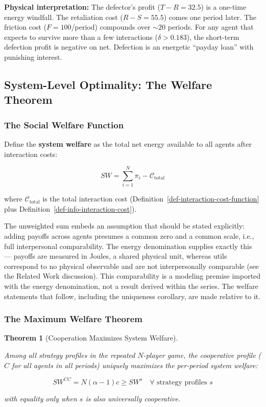 \documentclass[11pt]{article}
\theoremstyle{plain}
\newtheorem{theorem}{Theorem}
\theoremstyle{definition}
\theoremstyle{remark}
\let\origsubsection\subsection
\renewcommand{\subsection}{\needspace{7\baselineskip}\origsubsection}
\let\origsubsubsection\subsubsection
\renewcommand{\subsubsection}{\needspace{4\baselineskip}\origsubsubsection}
\begin{document}
\textbf{Physical interpretation:} The defector's profit
(\(T - R = 32.5\)) is a one-time energy windfall. The retaliation cost
(\(R - S = 55.5\)) comes one period later. The friction cost
(\(F = 100\)/period) compounds over \(\sim 20\) periods. For any agent
that expects to survive more than a few interactions
(\(\delta > 0.183\)), the short-term defection profit is negative on
net. Defection is an energetic ``payday loan'' with punishing interest.

\subsection{System-Level Optimality: The Welfare
Theorem}\label{system-level-optimality-the-welfare-theorem}

\subsubsection{The Social Welfare
Function}\label{the-social-welfare-function}

Define the \textbf{system welfare} as the total net energy available to
all agents after interaction costs:

\[SW = \sum_{i=1}^{N} \pi_i - \mathcal{C}_{\text{total}}\]

where \(\mathcal{C}_{\text{total}}\) is the total interaction cost
(Definition~\ref{def-interaction-cost-function} plus
Definition~\ref{def-info-interaction-cost}).

The unweighted sum embeds an assumption that should be stated
explicitly: adding payoffs across agents presumes a common zero and a
common scale, i.e., full interpersonal comparability. The energy
denomination supplies exactly this --- payoffs are measured in Joules, a
shared physical unit, whereas utils correspond to no physical observable
and are not interpersonally comparable (see the Related Work
discussion). This comparability is a modeling premise imported with the
energy denomination, not a result derived within the series. The welfare
statements that follow, including the uniqueness corollary, are made
relative to it.

\subsubsection{The Maximum Welfare
Theorem}\label{the-maximum-welfare-theorem}

\begin{theorem}[Cooperation Maximizes System Welfare]
\label{thm-cooperation-maximizes-welfare}

Among all strategy profiles in the repeated $N$-player game, the cooperative profile ($C$ for all agents in all periods) uniquely maximizes the per-period system welfare:

$$SW^{CC} = N(\alpha - 1)c \geq SW^{s} \quad \forall \text{ strategy profiles } s$$

with equality only when $s$ is also universally cooperative.
\end{theorem}
\end{document}
